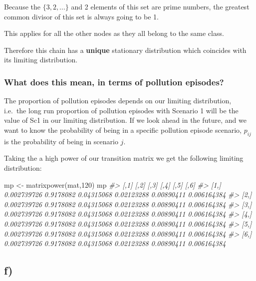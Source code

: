 \documentclass[
]{article}
\newenvironment{Shaded}{\begin{snugshade}}{\end{snugshade}}
\newcommand{\CommentTok}[1]{\textcolor[rgb]{0.56,0.35,0.01}{\textit{#1}}}
\newcommand{\DecValTok}[1]{\textcolor[rgb]{0.00,0.00,0.81}{#1}}
\newcommand{\FunctionTok}[1]{\textcolor[rgb]{0.00,0.00,0.00}{#1}}
\newcommand{\NormalTok}[1]{#1}
\newcommand{\OtherTok}[1]{\textcolor[rgb]{0.56,0.35,0.01}{#1}}
\begin{document}
Because the \(\{3,2,...\}\) and 2 elements of this set are prime
numbers, the greatest common divisor of this set is always going to be
1.

This applies for all the other nodes as they all belong to the same
class.

Therefore this chain has a \textbf{unique} stationary distribution which
coincides with its limiting distribution.

\hypertarget{what-does-this-mean-in-terms-of-pollution-episodes}{%
\subsubsection{What does this mean, in terms of pollution
episodes?}\label{what-does-this-mean-in-terms-of-pollution-episodes}}

The proportion of pollution episodes depends on our limiting
distribution, i.e.~the long run proportion of pollution episodes with
Scenario 1 will be the value of Sc1 in our limiting distribution. If we
look ahead in the future, and we want to know the probability of being
in a specific pollution episode scenario, \(p_{ij}\) is the probability
of being in scenario \(j\).

Taking the a high power of our transition matrix we get the following
limiting distribution:

\begin{Shaded}
\begin{Highlighting}[]
\NormalTok{mp }\OtherTok{\textless{}{-}} \FunctionTok{matrixpower}\NormalTok{(mat,}\DecValTok{120}\NormalTok{)}
\NormalTok{mp}
\CommentTok{\#\textgreater{}             [,1]      [,2]       [,3]       [,4]       [,5]        [,6]}
\CommentTok{\#\textgreater{} [1,] 0.002739726 0.9178082 0.04315068 0.02123288 0.00890411 0.006164384}
\CommentTok{\#\textgreater{} [2,] 0.002739726 0.9178082 0.04315068 0.02123288 0.00890411 0.006164384}
\CommentTok{\#\textgreater{} [3,] 0.002739726 0.9178082 0.04315068 0.02123288 0.00890411 0.006164384}
\CommentTok{\#\textgreater{} [4,] 0.002739726 0.9178082 0.04315068 0.02123288 0.00890411 0.006164384}
\CommentTok{\#\textgreater{} [5,] 0.002739726 0.9178082 0.04315068 0.02123288 0.00890411 0.006164384}
\CommentTok{\#\textgreater{} [6,] 0.002739726 0.9178082 0.04315068 0.02123288 0.00890411 0.006164384}
\end{Highlighting}
\end{Shaded}

\newpage

\hypertarget{f}{%
\subsection{f)}\label{f}}
\end{document}

